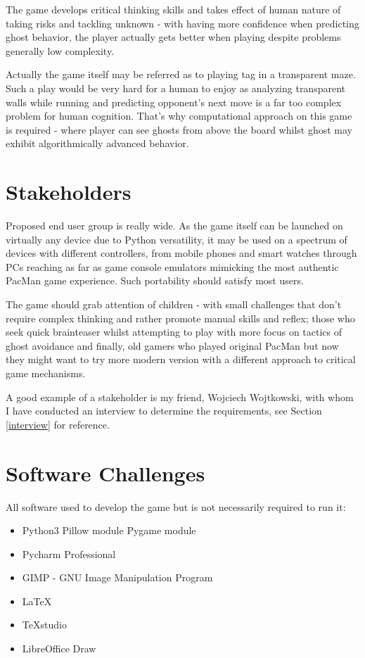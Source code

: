 \documentclass[11pt,a4paper,notitlepage]{report}
\begin{document}
			
			The game develops critical thinking skills and takes effect of human nature of taking risks and tackling unknown - with having more confidence when predicting ghost behavior, the player actually gets better when playing despite problems generally low complexity.
			
			Actually the game itself may be referred as to playing tag in a transparent maze. Such a play would be very hard for a human to enjoy as analyzing transparent walls while running and predicting opponent's next move is a far too complex problem for human cognition. That's why computational approach on this game is required - where player can see ghosts from above the board whilst ghost may exhibit algorithmically advanced behavior.


		\section{Stakeholders}
			Proposed end user group is really wide. As the game itself can be launched on virtually any device due to Python versatility, it may be used on a spectrum of devices with different controllers, from mobile phones and smart watches through PCs reaching as far as game console emulators mimicking the most authentic PacMan game experience. Such portability should satisfy most users.
			
			The game should grab attention of children - with small challenges that don't require complex thinking and rather promote manual skills and reflex; those who seek quick brainteaser whilst attempting to play with more focus on tactics of ghost avoidance and finally, old gamers who played original PacMan but now they might want to try more modern version with a different approach to critical game mechanisms.
			
			A good example of a stakeholder is my friend, Wojciech Wojtkowski, with whom I have conducted an interview to determine the requirements, see Section \ref{interview} for reference.
		\section{Software Challenges}
			All software used to develop the game but is not necessarily required to run it:
			\begin{itemize}
				\item Python3
				\subitem Pillow module
				\subitem Pygame module
				\item Pycharm Professional
				\item GIMP - GNU Image Manipulation Program
				\item \LaTeX
				\item TeXstudio
				\item LibreOffice Draw
			\end{itemize}
			
\end{document}
